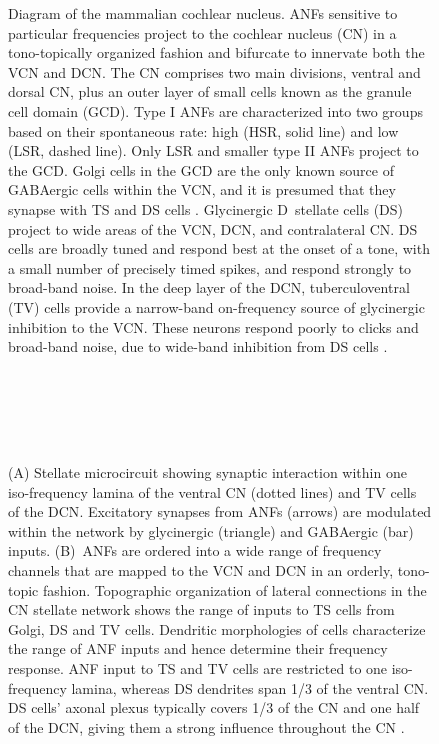  \begin{figure}[pt!]
\centering
   \caption[Diagram of the mammalian cochlear nucleus]{Diagram of the mammalian cochlear nucleus. {ANF}s
     sensitive to particular frequencies project to the cochlear
     nucleus (CN) in a tono-topically organized fashion and bifurcate
     to innervate both the {VCN} and {DCN}. The {CN} comprises
     two main divisions, ventral and dorsal CN, plus an outer layer of
     small cells known as the granule cell domain (GCD). Type I
     {ANF}s are characterized into two groups based on their
     spontaneous rate: high (HSR, solid line) and low (LSR, dashed
     line). Only LSR and smaller type II {ANF}s project to the {GCD}.
     Golgi cells in the {GCD} are the only known source of {GABA}ergic
     cells within the VCN, and it is presumed that they synapse with
     TS and DS cells \citep{FerragamoGoldingEtAl:1998}. Glycinergic
     D~stellate cells (DS) project to wide areas of the VCN, DCN,
     and contralateral {CN}. DS cells are broadly tuned and respond
     best at the onset of a tone, with a small number of precisely
     timed spikes, and respond strongly to broad-band noise.  In the
     deep layer of the DCN, tuberculoventral (TV) cells provide
     a narrow-band on-frequency source of glycinergic inhibition to
     the VCN. These neurons respond poorly to clicks and
     broad-band noise, due to wide-band inhibition from DS cells
     \citep{SpirouDavisEtAl:1999}.}
\label{fig:GA:CNdiagram}
 \end{figure}


\begin{figure}[t!]
\centering
{}\hspace{3in}\\
\\
\hspace{3in}\\
\\
\caption[CN stellate microcircuit]{(A) Stellate microcircuit showing synaptic interaction within
  one iso-frequency lamina of the ventral {CN} (dotted lines) and TV
  cells of the {DCN}\@. Excitatory synapses from {ANF}s (arrows)
  are modulated within the network by glycinergic (triangle) and
  GABAergic (bar) inputs. (B)~ANFs are ordered into a wide range of
  frequency channels that are mapped to the {VCN} and {DCN} in an orderly, tono-topic fashion. Topographic organization of
  lateral connections in the {CN} stellate network shows the range of
  inputs to TS cells from Golgi, DS and TV cells. Dendritic
  morphologies of cells characterize the range of {ANF} inputs and
  hence determine their frequency response. {ANF} input to TS and TV
  cells are restricted to one iso-frequency lamina, whereas DS
  dendrites span 1/3 of the ventral CN\@. DS cells' axonal plexus
  typically covers 1/3 of the {CN} and one half of the DCN, giving them a strong influence throughout the {CN}
  \citep{ArnottWallaceEtAl:2004}.}\label{fig:GA:MicroCN}
\end{figure}

